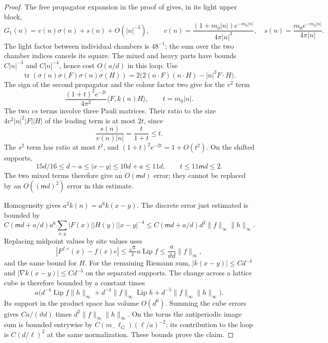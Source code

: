 \documentclass[11pt,letterpaper,reqno]{amsart}
\theoremstyle{definition}
\theoremstyle{remark}
\begin{document}
\begin{proof}
The free propagator expansion in the proof of
\cite[Lem. 11.5]{QCDM1} gives, in its light upper block,
\[
 G_1(n)=v(n)\sigma(n)+s(n)+O(|n|^{-3}),\qquad
 v(n)=\frac{(1+m_0|n|)e^{-m_0|n|}}{4\pi|n|^3},\quad
 s(n)=\frac{m_0e^{-m_0|n|}}{4\pi|n|}.
\]
The light factor between individual chambers is $48^{-1}$;
the sum over the two chamber indices cancels its square.
The mixed and heavy parts have bounds $C|n|^{-3}$ and
$C|n|^{-4}$, hence cost $O(a/d)$ in this loop.
Use
\[
 \operatorname{tr}(\sigma(n)\sigma(F)\sigma(n)\sigma(H))
       =2\bigl(2(n\cdot F)(n\cdot H)-|n|^2F\cdot H\bigr).
\]
The sign of the second propagator and the colour factor
two give for the $v^2$ term
\[
 \frac{(1+t)^2e^{-2t}}{4\pi^2}\langle F,k(n)H\rangle,
 \qquad t=m_0|n|.
\]
The two $vs$ terms involve three Pauli matrices.
Their ratio to the size $4v^2|n|^2|F||H|$ of the
leading term is at most $2t$, since
\[
 \frac{s(n)}{v(n)|n|}=\frac{t}{1+t}\le t.
\]
The $s^2$ term has ratio at most $t^2$, and
$(1+t)^2e^{-2t}=1+O(t^2)$. On the shifted supports,
\[
 15d/16\le d-a\le|x-y|\le10d+a\le11d,
 \qquad t\le11\mathsf m d\le2.
\]
The two mixed terms therefore give an
$O(\mathsf m d)$ error; they cannot be replaced by
an $O((\mathsf m d)^2)$ error in this estimate.

Homogeneity gives $a^2k(n)=a^6k(x-y)$.
The discrete error just estimated is bounded by
\[
 C(\mathsf m d+a/d)a^6
   \sum_{x,y}|F(x)||H(y)||x-y|^{-4}
 \le C(\mathsf m d+a/d)d^2\|f\|_\infty\|h\|_\infty.
\]
Replacing midpoint values by site values uses
\[
 |F^{f,e}(x)-f(x)e|
 \le\tfrac{\sqrt3}{2}a\operatorname{Lip}f
 \le\frac{a}{\vartheta d}\|f\|_\infty,
\]
and the same bound for $H$. For the remaining Riemann
sum, $|k(x-y)|\le Cd^{-4}$ and
$|\nabla k(x-y)|\le Cd^{-5}$ on the separated supports.
The change across a lattice cube is therefore bounded
by a constant times
\[
 a\bigl(d^{-4}\operatorname{Lip}f\|h\|_\infty
       +d^{-4}\|f\|_\infty\operatorname{Lip}h
       +d^{-5}\|f\|_\infty\|h\|_\infty\bigr).
\]
Its support in the product space has volume $O(d^6)$.
Summing the cube errors gives
$Ca/(\vartheta d)$ times
$d^2\|f\|_\infty\|h\|_\infty$.
On the torus the antiperiodic image sum is bounded
entrywise by $C({m_-}\ell_G)(\ell/a)^{-2}$;
its contribution to the loop is $C(d/\ell)^2$ at
the same normalization.  These bounds prove the claim.
\end{proof}
\end{document}
